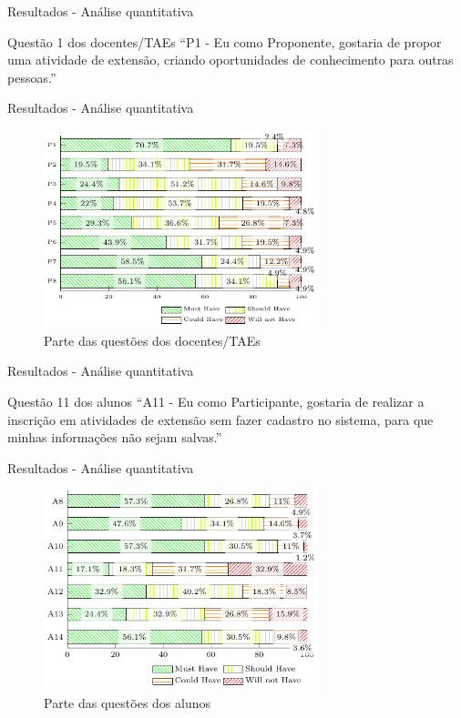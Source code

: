 \begin{frame}{{\sffamily Resultados - Análise quantitativa}}
  \begin{block}{Questão 1 dos docentes/TAEs}
    ``P1 - Eu como Proponente, gostaria de propor uma atividade de extensão, criando oportunidades de conhecimento para outras pessoas.''
  \end{block}
\end{frame}

\begin{frame}{{\sffamily Resultados - Análise quantitativa}}
  \begin{figure}
    \centering
    \caption{Parte das questões dos docentes/TAEs}
    \includegraphics[width=8cm, ]{img/5-questions-proponent.pdf}
  \end{figure}
\end{frame}

\begin{frame}{{\sffamily Resultados - Análise quantitativa}}
  \begin{block}{Questão 11 dos alunos}
    ``A11 - Eu como Participante, gostaria de realizar a inscrição em atividades de extensão sem fazer cadastro no sistema, para que minhas informações não sejam salvas.''
  \end{block}
\end{frame}

\begin{frame}{{\sffamily Resultados - Análise quantitativa}}
  \begin{figure}
    \centering
    \caption{Parte das questões dos alunos}
    \includegraphics[width=8cm, ]{img/5-questions-participant-2.pdf}
  \end{figure}
\end{frame}

